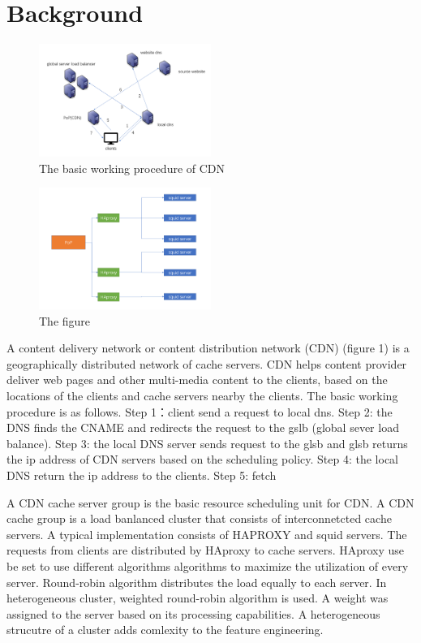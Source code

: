 \documentclass[5p]{elsarticle}
\begin{document}
\section{Background}
\begin{figure}[h]
    \centering
    \includegraphics[width=0.5\textwidth]{CDN_new.png}
    \caption{The basic working procedure of CDN}
    \label{fig}
\end{figure}

\begin{figure}[h]
    \centering
    \includegraphics[width=0.5\textwidth]{cache_group.png}
    \caption{The figure}
    \label{fig: the structure of PoP}
\end{figure}

A content delivery network or content distribution network (CDN) (figure 1) is a geographically distributed network of cache servers. CDN helps content provider deliver web pages and other multi-media content to the clients, based on the locations of the clients and cache servers nearby the clients. The basic working procedure is as follows. Step 1：client send a request to local dns. Step 2: the DNS finds the CNAME and redirects the request to the gslb (global sever load balance). Step 3: the local DNS server sends request to the glsb and glsb returns the ip address of CDN servers based on the scheduling policy. Step 4: the local DNS return the ip address to the clients. Step 5: fetch 


A CDN cache server group is the basic resource scheduling unit for CDN. A CDN cache group is a load banlanced cluster that consists of interconnetcted cache servers. A typical implementation consists of HAPROXY and squid servers. The requests from clients are distributed by HAproxy to cache servers. HAproxy use be set to use different algorithms algorithms to maximize the utilization of every server. Round-robin algorithm distributes the load equally to each server. In heterogeneous cluster,  weighted round-robin algorithm is used. A weight was assigned to the server based on its processing capabilities. A heterogeneous strucutre of a cluster adds comlexity to the feature engineering.
\end{document}
